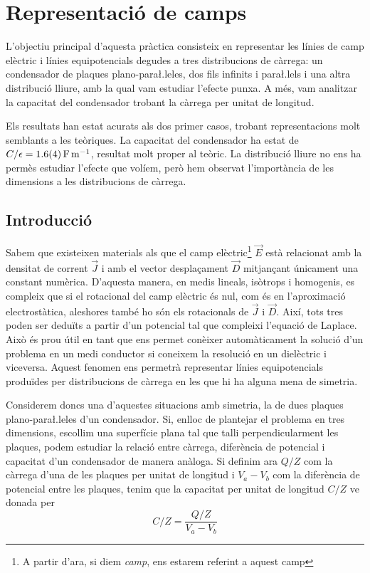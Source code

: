 \chapter{Representació de camps} \label{ch:informe 1}
\begin{resum}
	L'objectiu principal d'aquesta pràctica consisteix en representar les línies de camp elèctric i línies equipotencials degudes a tres distribucions de càrrega: un condensador de plaques plano-para\l.leles, dos fils infinits i para\l.lels i una altra distribució lliure, amb la qual vam estudiar l'efecte punxa. A més, vam analitzar la capacitat del condensador trobant la càrrega per unitat de longitud.

	Els resultats han estat acurats als dos primer casos, trobant representacions molt semblants a les teòriques. La capacitat del condensador ha estat de $C/\epsilon = \data{1.6}{0.4}{F.m^{-1}} $, resultat molt proper al teòric. La distribució lliure no ens ha permès estudiar l'efecte que volíem, però hem observat l'importància de les dimensions a les distribucions de càrrega.
\end{resum}

\section{Introducció}
Sabem que existeixen materials als que el camp elèctric\footnote{A partir d'ara, si diem \textit{camp}, ens estarem referint a aquest camp} $\vec{E}$ està relacionat amb la densitat de corrent $\vec{J}$ i amb el vector desplaçament $\vec{D}$ mitjançant únicament una constant numèrica. D'aquesta manera, en medis lineals, isòtrops i homogenis, es compleix que si el rotacional del camp elèctric és nul, com és en l'aproximació electrostàtica, aleshores també ho són els rotacionals de $\vec{J}$ i $\vec{D}$. Així, tots tres poden ser deduïts a partir d'un potencial tal que compleixi l'equació de Laplace. Això és prou útil en tant que ens permet conèixer automàticament la solució d'un problema en un medi conductor si coneixem la resolució en un dielèctric i viceversa. Aquest fenomen ens permetrà representar línies equipotencials produïdes per distribucions de càrrega en les que hi ha alguna mena de simetria.

Considerem doncs una d'aquestes situacions amb simetria, la de dues plaques plano-para\l.leles d'un condensador. Si, enlloc de plantejar el problema en tres dimensions, escollim una superfície plana tal que talli perpendicularment les plaques, podem estudiar la relació entre càrrega, diferència de potencial i capacitat d'un condensador de manera anàloga. Si definim ara $Q/Z$ com la càrrega d'una de les plaques per unitat de longitud i $V_a-V_b$ com la diferència de potencial entre les plaques, tenim que la capacitat per unitat de longitud $C/Z$ ve donada per
\begin{equation} \label{eq:capacitat}
	C/Z=\frac{Q/Z}{V_a-V_b}
\end{equation}

